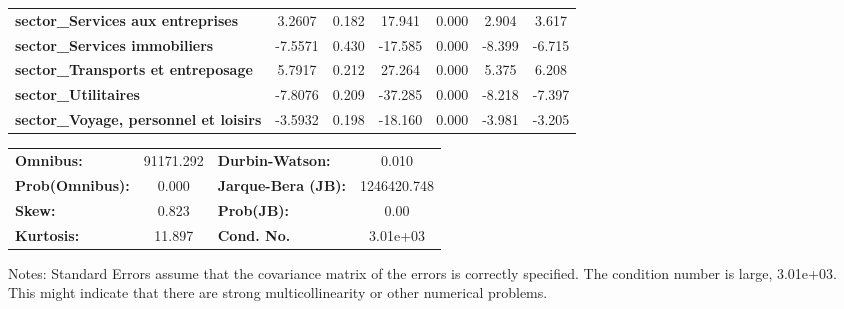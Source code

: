 \begin{center}
\begin{tabular}{lcccccc}
\textbf{sector\_Services aux entreprises}                             &       3.2607  &        0.182     &    17.941  &         0.000        &        2.904    &        3.617     \\
\textbf{sector\_Services immobiliers}                                 &      -7.5571  &        0.430     &   -17.585  &         0.000        &       -8.399    &       -6.715     \\
\textbf{sector\_Transports et entreposage}                            &       5.7917  &        0.212     &    27.264  &         0.000        &        5.375    &        6.208     \\
\textbf{sector\_Utilitaires}                                          &      -7.8076  &        0.209     &   -37.285  &         0.000        &       -8.218    &       -7.397     \\
\textbf{sector\_Voyage, personnel et loisirs}                         &      -3.5932  &        0.198     &   -18.160  &         0.000        &       -3.981    &       -3.205     \\
\bottomrule
\end{tabular}
\begin{tabular}{lclc}
\textbf{Omnibus:}       & 91171.292 & \textbf{  Durbin-Watson:     } &      0.010   \\
\textbf{Prob(Omnibus):} &    0.000  & \textbf{  Jarque-Bera (JB):  } & 1246420.748  \\
\textbf{Skew:}          &    0.823  & \textbf{  Prob(JB):          } &       0.00   \\
\textbf{Kurtosis:}      &   11.897  & \textbf{  Cond. No.          } &   3.01e+03   \\
\bottomrule
\end{tabular}
\end{center}

Notes: \newline
 [1] Standard Errors assume that the covariance matrix of the errors is correctly specified. \newline
 [2] The condition number is large, 3.01e+03. This might indicate that there are \newline
 strong multicollinearity or other numerical problems.